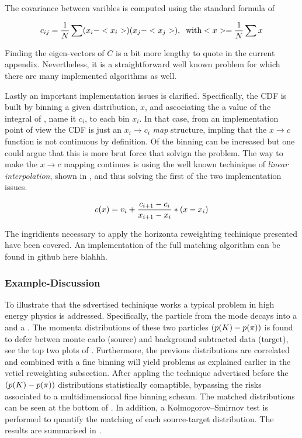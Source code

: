 \noindent The covariance between varibles is computed using the standard formula of 

\begin{equation}
\centering
c_{ij} = \frac{1}{N} \sum (x_i-<x_i>)(x_j-<x_j>), \;\; \text {with} <x> = \frac{1}{N} \sum x \nonumber
\label{hor_reww_correlation_formula}
\end{equation}

\noindent Finding the eigen-vectors of $C$ is a bit more lengthy to quote in the current appendix.
Nevertheless, it is a straightforward well known problem for which there are many implemented
algorithms as well.

Lastly an important implementation issues is clarified. Specifically, the CDF is built by binning a
given distribution, $x$, and ascociating the a value of the integral of , name it $c_i$,
to each bin $x_i$. In that case, from an implementation point of view the CDF is just an $x_i \to c_i$ {\it map}
structure, impling that the $x \to c$ function is not continuous by definition. Of the binning can be increased
but one could argue that this is more brut force that solvign the problem. The way to make the $x \to c$ mapping
continues is using the well known techinique of {\it linear interpolation}, shown in ,
and thus solving the first of the two implementation issues.

\begin{equation}
  c(x) = v_i + \frac{c_{i+1}-c_i}{x_{i+1}-x_i} *  \left( x - x_i \right)
  \label{linear_interpolation}
\end{equation}

The ingridients necessary to apply the horizonta reweighting techinique presented have been covered.
An implementation of the full matching algorithm can be found in github here blahhh.

\subsubsection{Example-Discussion}
To illustrate that the sdvertised techinique works a typical problem in high energy physics is addressed.
Specifically, the \Kstarz particle from the \BsJpsiKst mode decays into a \kaon and a \pion. The momenta
distributions of these two particles $\left( \mbox{$p$}(K)-\mbox{$p$}(\pi) \right)$ is found to defer betwen
monte carlo (source) and background subtracted data (target), see the top two plots of .
Furthermore, the previous distributions are correlated and combined with a fine binning will yield problems as explained
earlier in the veticl reweighting subsection. After appling the technique advertised before the
$\left( \mbox{$p$}(K)-\mbox{$p$}(\pi) \right)$ distributions statistically comaptible, bypassing the risks associated
to a multidimensional fine binning scheam. The matched distributions can be seen at the bottom of .
In addition, a Kolmogorov–Smirnov test is performed to quantify the matching of each source-target distribution.
The results are summarised in .

